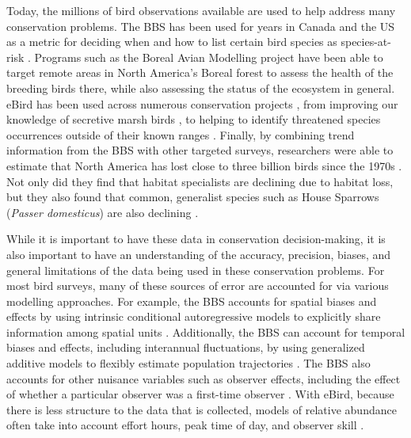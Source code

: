 \par Today, the millions of bird observations available are used to help address many conservation problems.
The BBS has been used for years in Canada and the US as a metric for deciding when and how to list certain bird species as species-at-risk \citep{hudson_role_2017}.
Programs such as the Boreal Avian Modelling project \citep{cumming_toward_2010, solymos_bam_2020} have been able to target remote areas in North America's Boreal forest to assess the health of the breeding birds there, while also assessing the status of the ecosystem in general.
eBird has been used across numerous conservation projects \citep{sullivan_ebird_2009, sullivan_ebird_2014}, from improving our knowledge of secretive marsh birds \citep{bianchini_using_2023}, to helping to identify threatened species occurrences outside of their known ranges \citep{lin_using_2022}.
Finally, by combining trend information from the BBS with other targeted surveys, researchers were able to estimate that North America has lost close to three billion birds since the 1970s \citep{rosenberg_decline_2019}.
Not only did they find that habitat specialists are declining due to habitat loss, but they also found that common, generalist species such as House Sparrows (\textit{Passer domesticus}) are also declining \citep{rosenberg_decline_2019}.

\par While it is important to have these data in conservation decision-making, it is also important to have an understanding of the accuracy, precision, biases, and general limitations of the data being used in these conservation problems.
For most bird surveys, many of these sources of error are accounted for via various modelling approaches.
For example, the BBS accounts for spatial biases and effects by using intrinsic conditional autoregressive models \citep{besag_bayesian_1991} to explicitly share information among spatial units \citep{smith_spatially_2023, smith_patterns_2023}. 
Additionally, the BBS can account for temporal biases and effects, including interannual fluctuations, by using generalized additive models \citep{wood_generalized_2017} to flexibly estimate population trajectories \citep{smith_north_2021}.
The BBS also accounts for other nuisance variables such as observer effects, including the effect of whether a particular observer was a first-time observer \citep{kendall_first-time_1996}.
With eBird, because there is less structure to the data that is collected, models of relative abundance often take into account effort hours, peak time of day, and observer skill \citep{johnston_estimates_2018, fink_double_2023}.

